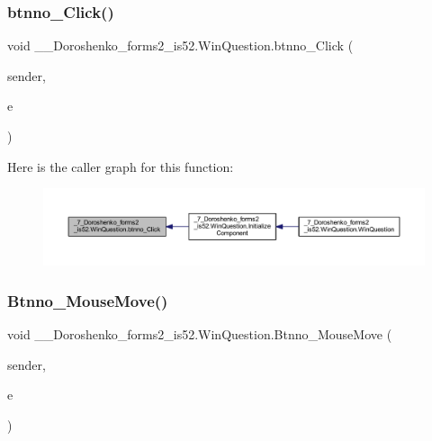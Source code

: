 \subsubsection{\texorpdfstring{btnno\+\_\+\+Click()}{btnno\_Click()}}
{\footnotesize\ttfamily void \+\_\+\_\+\+Doroshenko\+\_\+forms2\+\_\+is52.\+Win\+Question.\+btnno\+\_\+\+Click (\begin{DoxyParamCaption}\item[{object}]{sender,  }\item[{Event\+Args}]{e }\end{DoxyParamCaption})\hspace{0.3cm}{\ttfamily [private]}}

Here is the caller graph for this function\+:
\nopagebreak
\begin{figure}[H]
\begin{center}
\leavevmode
\includegraphics[width=350pt]{class__7___doroshenko__forms2__is52_1_1_win_question_addf298ada9a525f8c97dbb9f930d6719_icgraph}
\end{center}
\end{figure}
\hypertarget{class__7___doroshenko__forms2__is52_1_1_win_question_ab81a4bed4ecc573353c189976316a282}{}\label{class__7___doroshenko__forms2__is52_1_1_win_question_ab81a4bed4ecc573353c189976316a282} 
\subsubsection{\texorpdfstring{Btnno\+\_\+\+Mouse\+Move()}{Btnno\_MouseMove()}}
{\footnotesize\ttfamily void \+\_\+\_\+\+Doroshenko\+\_\+forms2\+\_\+is52.\+Win\+Question.\+Btnno\+\_\+\+Mouse\+Move (\begin{DoxyParamCaption}\item[{object}]{sender,  }\item[{Mouse\+Event\+Args}]{e }\end{DoxyParamCaption})\hspace{0.3cm}{\ttfamily [private]}}

